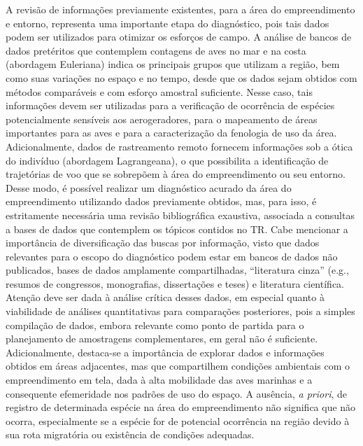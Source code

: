 \documentclass[
  oneside]{scrbook}
\begin{document}
A revisão de informações previamente existentes, para a área do empreendimento e entorno, representa uma importante etapa do diagnóstico, pois tais dados podem ser utilizados para otimizar os esforços de campo. A análise de bancos de dados pretéritos que contemplem contagens de aves no mar e na costa (abordagem Euleriana) indica os principais grupos que utilizam a região, bem como suas variações no espaço e no tempo, desde que os dados sejam obtidos com métodos comparáveis e com esforço amostral suficiente. Nesse caso, tais informações devem ser utilizadas para a verificação de ocorrência de espécies potencialmente sensíveis aos aerogeradores, para o mapeamento de áreas importantes para as aves e para a caracterização da fenologia de uso da área. Adicionalmente, dados de rastreamento remoto fornecem informações sob a ótica do indivíduo (abordagem Lagrangeana), o que possibilita a identificação de trajetórias de voo que se sobrepõem à área do empreendimento ou seu entorno. Desse modo, é possível realizar um diagnóstico acurado da área do empreendimento utilizando dados previamente obtidos, mas, para isso, é estritamente necessária uma revisão bibliográfica exaustiva, associada a consultas a bases de dados que contemplem os tópicos contidos no TR. Cabe mencionar a importância de diversificação das buscas por informação, visto que dados relevantes para o escopo do diagnóstico podem estar em bancos de dados não publicados, bases de dados amplamente compartilhadas, ``literatura cinza'' (e.g., resumos de congressos, monografias, dissertações e teses) e literatura científica. Atenção deve ser dada à análise crítica desses dados, em especial quanto à viabilidade de análises quantitativas para comparações posteriores, pois a simples compilação de dados, embora relevante como ponto de partida para o planejamento de amostragens complementares, em geral não é suficiente. Adicionalmente, destaca-se a importância de explorar dados e informações obtidos em áreas adjacentes, mas que compartilhem condições ambientais com o empreendimento em tela, dada à alta mobilidade das aves marinhas e a consequente efemeridade nos padrões de uso do espaço. A ausência, \emph{a priori}, de registro de determinada espécie na área do empreendimento não significa que não ocorra, especialmente se a espécie for de potencial ocorrência na região devido à sua rota migratória ou existência de condições adequadas.
\end{document}
